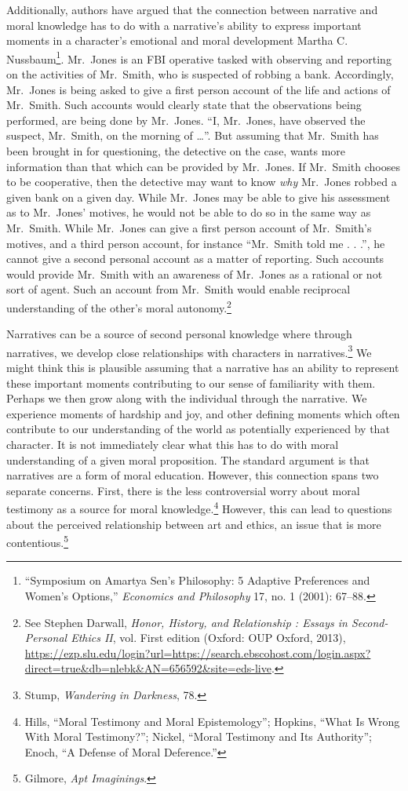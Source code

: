 \documentclass[phdthesis,12pt,final]{wuthesis}
\theoremstyle{definition}
\theoremstyle{definition}
\theoremstyle{definition}
\theoremstyle{definition}
\theoremstyle{remark}
\begin{document}
Additionally, authors have argued that the connection between narrative and moral knowledge has to do with a narrative's ability to express important moments in a character's emotional and moral development Martha C. Nussbaum\footnote{{``Symposium on {Amartya Sen}'s Philosophy: 5 Adaptive Preferences and Women's Options,''} \emph{Economics and Philosophy} 17, no. 1 (2001): 67--88.}. Mr.~Jones is an FBI operative tasked with observing and reporting on the activities of Mr.~Smith, who is suspected of robbing a bank. Accordingly, Mr.~Jones is being asked to give a first person account of the life and actions of Mr.~Smith. Such accounts would clearly state that the observations being performed, are being done by Mr.~Jones. ``I, Mr.~Jones, have observed the suspect, Mr.~Smith, on the morning of \ldots{}''. But assuming that Mr.~Smith has been brought in for questioning, the detective on the case, wants more information than that which can be provided by Mr.~Jones. If Mr.~Smith chooses to be cooperative, then the detective may want to know \emph{why} Mr.~Jones robbed a given bank on a given day. While Mr.~Jones may be able to give his assessment as to Mr.~Jones' motives, he would not be able to do so in the same way as Mr.~Smith. While Mr.~Jones can give a first person account of Mr.~Smith's motives, and a third person account, for instance ``Mr.~Smith told me . . .'', he cannot give a second personal account as a matter of reporting. Such accounts would provide Mr.~Smith with an awareness of Mr.~Jones as a rational or not sort of agent. Such an account from Mr.~Smith would enable reciprocal understanding of the other's moral autonomy.\footnote{See Stephen Darwall, \emph{Honor, {History}, and {Relationship} : {Essays} in {Second-Personal Ethics II}}, vol. First edition (Oxford: OUP Oxford, 2013), \url{https://ezp.slu.edu/login?url=https://search.ebscohost.com/login.aspx?direct=true&db=nlebk&AN=656592&site=eds-live}.}

Narratives can be a source of second personal knowledge where through narratives, we develop close relationships with characters in narratives.\footnote{Stump, \emph{Wandering in {Darkness}}, 78.} We might think this is plausible assuming that a narrative has an ability to represent these important moments contributing to our sense of familiarity with them. Perhaps we then grow along with the individual through the narrative. We experience moments of hardship and joy, and other defining moments which often contribute to our understanding of the world as potentially experienced by that character. It is not immediately clear what this has to do with moral understanding of a given moral proposition. The standard argument is that narratives are a form of moral education. However, this connection spans two separate concerns. First, there is the less controversial worry about moral testimony as a source for moral knowledge.\footnote{Hills, {``Moral Testimony and Moral Epistemology''}; Hopkins, {``What {Is Wrong With Moral Testimony}?''}; Nickel, {``Moral {Testimony} and Its {Authority}''}; Enoch, {``A {Defense} of {Moral Deference}.''}} However, this can lead to questions about the perceived relationship between art and ethics, an issue that is more contentious.\footnote{Gilmore, \emph{Apt {Imaginings}}.}
\end{document}
